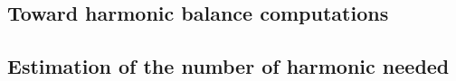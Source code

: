 
\subsection{Toward harmonic balance computations}
\label{sub:toward_harmonic_balance_computations}



\subsection{Estimation of the number of harmonic needed} %
\label{sub:estimation_of_the_number_of_harmonic_needed}

